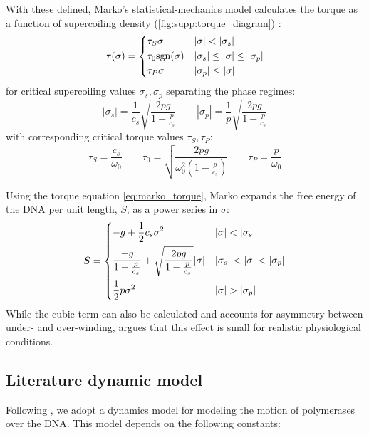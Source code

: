 \documentclass[11pt]{article}
\begin{document}
With these defined, Marko's statistical-mechanics model calculates the torque as a function of supercoiling density (\cref{fig:supp:torque_diagram}) \parencite{markoTorqueDynamicsLinking2007}:
\begin{equation}
    \tau(\sigma) = \begin{dcases} \tau_S \sigma & |\sigma| < |\sigma_s| \\ \tau_0 \text{sgn}(\sigma) & |\sigma_s| \leq |\sigma | \leq |\sigma_p| \\ \tau_P \sigma & |\sigma_p| \leq |\sigma|\end{dcases}
    \label{eq:marko_torque}
\end{equation}
for critical supercoiling values \(\sigma_s, \sigma_p\) separating the phase regimes:
\[|\sigma_s| = \frac{1}{c_s} \sqrt{\frac{2pg}{1 - \frac{p}{c_s}}} \qquad |\sigma_p| = \frac{1}{p} \sqrt{\frac{2pg}{1 - \frac{p}{c_s}}}\]
with corresponding critical torque values \(\tau_S, \tau_P\):
\[\tau_S = \frac{c_s}{\omega_0} \qquad \tau_0 = \sqrt{\frac{2 pg}{\omega_0^2 \left(1 - \frac{p}{c_s}\right)}} \qquad \tau_P = \frac{p}{\omega_0} \]

Using the torque equation \cref{eq:marko_torque}, Marko expands the free energy of the DNA per unit length, \(S\), as a power series in \(\sigma\):
\begin{equation}
    S = \begin{dcases}
        -g + \frac{1}{2} c_s \sigma^2 & |\sigma| < |\sigma_s| \\
        \frac{-g}{1 - \frac{p}{c_s}} + \sqrt{\frac{2 p g}{1 - \frac{p}{c_s}}} |\sigma| & |\sigma_s| < |\sigma| < |\sigma_p| \\
        \frac{1}{2} p \sigma^2 & |\sigma| > |\sigma_p|
    \end{dcases}
    \label{eq:marko_energy}
\end{equation}
While the cubic term can also be calculated and accounts for asymmetry between under- and over-winding,  \textcite{markoTorqueDynamicsLinking2007} argues that this effect is small for realistic physiological conditions.

\subsection{Literature dynamic model}
Following \textcite{sevierPropertiesGeneExpression2018}, we adopt a dynamics model for modeling the motion of polymerases over the DNA. This model depends on the following constants:
\end{document}
